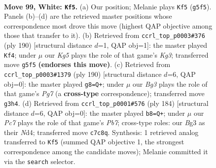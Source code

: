\documentclass[11pt]{article}
\begin{document}
\clearpage

\begin{figure}[p]\centering
\begin{subfigure}{0.46\textwidth}\centering
\resizebox{\linewidth}{!}{%
\newchessgame
\chessboard[
  setfen={5k2/2P5/8/6K1/8/6B1/8/8 w - - 23 99},
  showmover=false,
  pgfstyle=straightmove, color=movearrow, markmove={g5-f5}
]}
\caption{}
\end{subfigure}\hfill
\begin{subfigure}{0.46\textwidth}\centering
\resizebox{\linewidth}{!}{%
\newchessgame
\chessboard[
  setfen={7k/8/6P1/8/8/3B2K1/8/8 w - - 1 96},
  showmover=false,
  pgfstyle=straightmove, color=movearrow, markmove={g3-f4}
]}
\caption{}
\end{subfigure}
\\[4pt]
\begin{subfigure}{0.46\textwidth}\centering
\resizebox{\linewidth}{!}{%
\newchessgame
\chessboard[
  setfen={8/6PK/4k3/8/8/8/8/8 w - - 3 96},
  showmover=false,
  pgfstyle=straightmove, color=movearrow, markmove={g7-g8}
]}
\caption{}
\end{subfigure}\hfill
\begin{subfigure}{0.46\textwidth}\centering
\resizebox{\linewidth}{!}{%
\newchessgame
\chessboard[
  setfen={8/KP6/3k4/8/3N4/8/8/8 w - - 3 93},
  showmover=false,
  pgfstyle=straightmove, color=movearrow, markmove={b7-b8}
]}
\caption{}
\end{subfigure}
\caption{\textbf{Move 99, White: \texttt{Kf5}.} (a) Our position; Melanie plays \texttt{Kf5} (\texttt{g5f5}). Panels (b)--(d) are the retrieved master positions whose correspondence most drove this move (highest QAP objective among those that transfer to it). (b) Retrieved from \texttt{ccrl\_top\_p0003\#376} (ply 190) [structural distance $d$=1, QAP obj=1]: the master played \texttt{Kf4}; under $\mu$ our \emph{Kg5} plays the role of that game's \emph{Kg3}; transferred move \texttt{g5f5} \textbf{(endorses this move)}. (c) Retrieved from \texttt{ccrl\_top\_p0003\#1379} (ply 190) [structural distance $d$=6, QAP obj=0]: the master played \texttt{g8=Q+}; under $\mu$ our \emph{Bg3} plays the role of that game's \emph{Pg7} (a \textbf{cross-type} correspondence); transferred move \texttt{g3h4}. (d) Retrieved from \texttt{ccrl\_top\_p0001\#576} (ply 184) [structural distance $d$=6, QAP obj=0]: the master played \texttt{b8=Q+}; under $\mu$ our \emph{Pc7} plays the role of that game's \emph{Pb7}; cross-type roles: our \emph{B}g3 as their \emph{N}d4; transferred move \texttt{c7c8q}. Synthesis: 1 retrieved analog transferred to \texttt{Kf5} (summed QAP objective 1, the strongest correspondence among the candidate moves); Melanie committed it via the \texttt{search} selector.}
\label{fig:thought-m196}
\end{figure}
\end{document}
